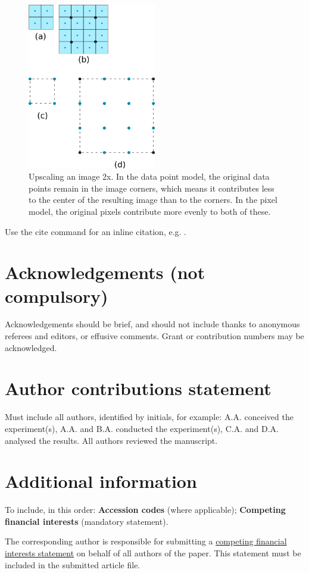 \documentclass[fleqn,10pt]{wlscirep}
\begin{document}
\begin{figure}[H]
    \centering
    \includegraphics[width=0.5\textwidth]{static/image_pixel_model}
    \caption{Upscaling an image 2x.  In the data point model, the
      original data points remain in the image corners, which means it
      contributes less to the center of the resulting image than to
      the corners.  In the pixel model, the original pixels contribute
      more evenly to both of these.}
    \label{fig:image-pixel-model}
\end{figure}



\noindent Use the cite command for an inline citation, e.g. \cite{behnel2011cython}.

\section*{Acknowledgements (not compulsory)}

Acknowledgements should be brief, and should not include thanks to anonymous referees and editors, or effusive comments. Grant or contribution numbers may be acknowledged.

\section*{Author contributions statement}

Must include all authors, identified by initials, for example:
A.A. conceived the experiment(s),  A.A. and B.A. conducted the experiment(s), C.A. and D.A. analysed the results.  All authors reviewed the manuscript.

\section*{Additional information}

To include, in this order: \textbf{Accession codes} (where applicable); \textbf{Competing financial interests} (mandatory statement).

The corresponding author is responsible for submitting a \href{http://www.nature.com/srep/policies/index.html#competing}{competing financial interests statement} on behalf of all authors of the paper. This statement must be included in the submitted article file.
\end{document}
